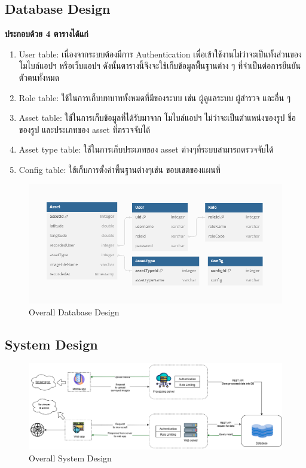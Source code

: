 \subsection{Database Design}
\textbf{ประกอบด้วย 4 ตารางได้แก่}
\begin{enumerate}
  \item User table: เนื่องจากระบบต้องมีการ Authentication เพื่อเข้าใช้งานไม่ว่าจะเป็นทั้งส่วนของ โมไบล์แอปฯ หรือเว็บแอปฯ 
  ดังนั้นตารางนี้จึงจะใช้เก็บข้อมูลพืื้นฐานต่าง ๆ ที่จำเป็นต่อการยืนยันตัวตนทั้งหมด 
  \item Role table: ใช้ในการเก็บบทบาททั้งหมดที่มีของระบบ เช่น ผู้ดูแลระบบ ผู้สำรวจ และอื่น ๆ 
  \item Asset table: ใช้ในการเก็บข้อมูลที่ได้รับมาจาก โมไบล์แอปฯ ไม่ว่าจะเป็นตำแหน่งของรูป ชื่อของรูป และประเภทของ asset ที่ตรวจจับได้ 
  \item Asset type table: ใช้ในการเก็บประเภทของ asset ต่างๆที่ระบบสามารถตรวจจับได้ 
  \item Config table: ใช้เก็บการตั้งค่าพื้นฐานต่างๆเช่น ขอบเขตของแผนที่ 
\end{enumerate}

\begin{figure}[ht]
  \begin{center}
  \includegraphics[scale=0.8]{resources/ScreetnerDB.png}
  \end{center}
  \caption[Database Design]{Overall Database Design}
  \label{fig:database}
\end{figure}

\newpage
\subsection{System Design}

\begin{figure}[ht]
  \begin{center}
  \includegraphics[scale=0.4]{resources/SystemDesign.png}
  \end{center}
  \caption[System Design]{Overall System Design}
  \label{fig:system design}
\end{figure}

